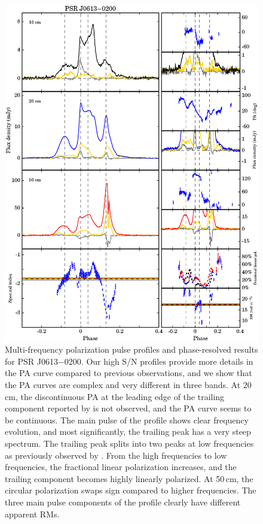 \documentclass[useAMS,usenatbib]{mn2e}
\begin{document}
\begin{appendix}
\begin{figure}
\begin{center}
\includegraphics[width=6 in]{0613.ps}
\caption{Multi-frequency polarization pulse profiles and phase-resolved results for PSR J0613$-$0200. Our high S/N 
profiles provide more details in the PA curve compared to previous observations, and we show that 
the PA curves are complex and very different in three bands. 
%
At 20\,cm, the discontinuous PA at the leading edge of the trailing 
component reported by \citet{Yan11} is not observed, and the PA curve seems 
to be continuous.
%
The main pulse of the profile shows clear frequency evolution, and most 
significantly, the trailing peak has a very steep spectrum. The 
trailing peak splits into two peaks at low frequencies as previously 
observed by \citet{Stairs99}.
%
From the high frequencies to low frequencies, the fractional linear 
polarization increases, and the trailing component becomes highly linearly 
polarized. 
%
At 50\,cm, the circular polarization swaps sign compared to higher 
frequencies.
%
The three main pulse components of the profile clearly have different 
apparent RMs.}
\label{0613}
\end{center}
\end{figure}


\end{appendix}
\end{document}
